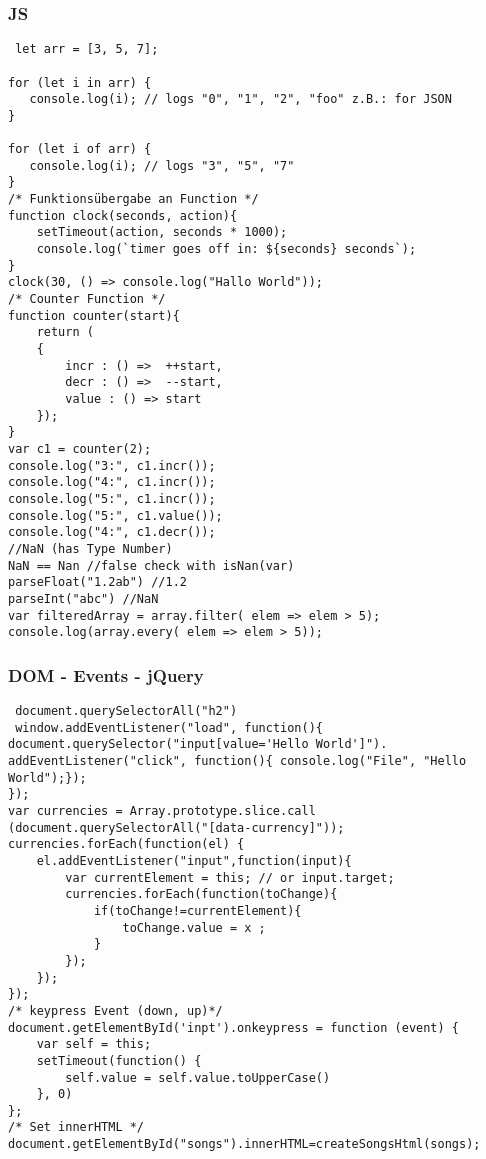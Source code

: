 \begin{multicols*}{4}
\subsubsection{JS}
 \begin{verbatim}
 let arr = [3, 5, 7];

for (let i in arr) {
   console.log(i); // logs "0", "1", "2", "foo" z.B.: for JSON
}

for (let i of arr) {
   console.log(i); // logs "3", "5", "7"
}
/* Funktionsübergabe an Function */
function clock(seconds, action){
    setTimeout(action, seconds * 1000);
    console.log(`timer goes off in: ${seconds} seconds`);
}
clock(30, () => console.log("Hallo World"));
/* Counter Function */
function counter(start){
    return (
    {
        incr : () =>  ++start,
        decr : () =>  --start,
        value : () => start
    });
}
var c1 = counter(2);
console.log("3:", c1.incr());
console.log("4:", c1.incr());
console.log("5:", c1.incr());
console.log("5:", c1.value());
console.log("4:", c1.decr());
//NaN (has Type Number)
NaN == Nan //false check with isNan(var)
parseFloat("1.2ab") //1.2
parseInt("abc") //NaN
var filteredArray = array.filter( elem => elem > 5); 
console.log(array.every( elem => elem > 5));
 \end{verbatim}

\subsubsection{DOM - Events - jQuery}
 \begin{verbatim}
 document.querySelectorAll("h2")
 window.addEventListener("load", function(){
document.querySelector("input[value='Hello World']").
addEventListener("click", function(){ console.log("File", "Hello World");});
});
var currencies = Array.prototype.slice.call
(document.querySelectorAll("[data-currency]"));
currencies.forEach(function(el) {
    el.addEventListener("input",function(input){
        var currentElement = this; // or input.target;
        currencies.forEach(function(toChange){
            if(toChange!=currentElement){
                toChange.value = x ;
            }
        });
    });
}); 
/* keypress Event (down, up)*/
document.getElementById('inpt').onkeypress = function (event) {
    var self = this;
    setTimeout(function() {
        self.value = self.value.toUpperCase()
    }, 0)
};
/* Set innerHTML */
document.getElementById("songs").innerHTML=createSongsHtml(songs);
\end{verbatim}


\end{multicols*}
